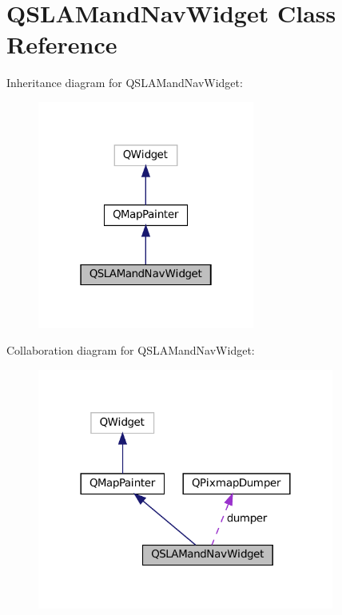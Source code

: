 \hypertarget{classQSLAMandNavWidget}{}\section{Q\+S\+L\+A\+Mand\+Nav\+Widget Class Reference}
\label{classQSLAMandNavWidget}


Inheritance diagram for Q\+S\+L\+A\+Mand\+Nav\+Widget\+:
\nopagebreak
\begin{figure}[H]
\begin{center}
\leavevmode
\includegraphics[width=202pt]{classQSLAMandNavWidget__inherit__graph}
\end{center}
\end{figure}


Collaboration diagram for Q\+S\+L\+A\+Mand\+Nav\+Widget\+:
\nopagebreak
\begin{figure}[H]
\begin{center}
\leavevmode
\includegraphics[width=276pt]{classQSLAMandNavWidget__coll__graph}
\end{center}
\end{figure}
